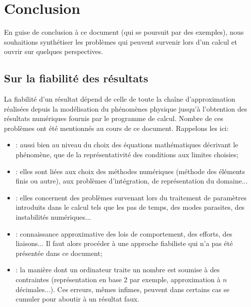 \chapter*{Conclusion}\label{Ch-Ccl}


En guise de conclusion à ce document (qui se poursuit par des exemples), nous souhaitions synthétiser
les problèmes qui peuvent survenir lors d'un calcul et ouvrir sur quelques perspectives.



\medskip
\section*{Sur la fiabilité des résultats}

La fiabilité d'un résultat dépend de celle de toute la chaîne d'approximation réalisées depuis la modélisation
du phénomènes physique jusqu'à l'obtention des résultats numériques fournis par le programme de calcul.
Nombre de ces problèmes ont été mentionnés au cours de ce document. Rappelons les ici:
\begin{itemize}
   \item {}: aussi bien au niveau du choix des équations mathématiques décrivant le phénomène,
	que de la représentativité des conditions aux limites choisies;
   \item {}: elles sont liées aux choix des méthodes numériques (méthode des éléments finis ou autre), aux problèmes
	d'intégration, de représentation du domaine...
   \item {}: elles concernent des problèmes survenant lors du traitement de paramètres
	introduits dans le calcul tels que les pas de temps, des modes parasites, des instabilités numériques...
   \item {}: connaissance approximative des lois de comportement, des efforts,
	des liaisons... Il faut alors procéder à une approche fiabiliste qui n'a pas été présentée dans ce document;
   \item {}: la manière dont un ordinateur traite un nombre est soumise à des contraintes
	(représentation en base 2 par exemple, approximation à $n$ décimales...). Ces erreurs, mêmes infimes, peuvent
	dans certains cas se cumuler pour aboutir à un résultat faux.
\end{itemize}

